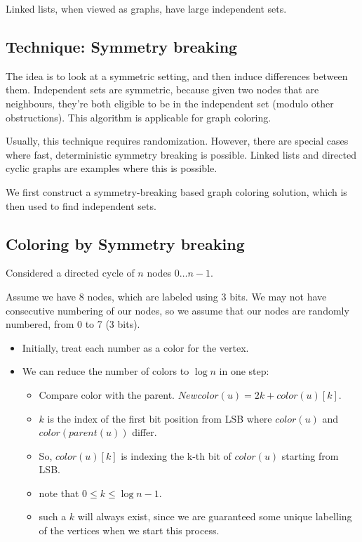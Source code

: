 Linked lists, when viewed as graphs, have large independent sets.

\subsection{Technique: Symmetry breaking}
The idea is to look at a symmetric setting, and then induce differences
between them. Independent sets are symmetric, because given two nodes
that are neighbours, they're both eligible to be in the independent set 
(modulo other obstructions). This algorithm is applicable for graph coloring.

Usually, this technique requires randomization. However, there are special
cases where fast, deterministic symmetry breaking is possible. Linked lists
and directed cyclic graphs are examples where this is possible.

We first construct a symmetry-breaking based graph coloring solution,
which is then used to find independent sets.

\subsection{Coloring by Symmetry breaking}
Considered a directed cycle of $n$ nodes $0 \dots n-1$.

Assume we have 8 nodes, which are labeled using 3 bits. We may not have
consecutive numbering of our nodes, so we assume that our nodes are randomly
numbered, from 0 to 7 (3 bits).


\begin{itemize}
    \item Initially, treat each number as a color for the vertex.
    \item We can reduce the number of colors to $\log n$ in one step:
    \begin{itemize}
    \item Compare color with the parent. $Newcolor(u) = 2 k + color(u)[k]$.
    \item $k$ is the index of the first bit position from LSB where $color(u)$ and $color(parent(u))$ differ.
    \item So, $color(u)[k]$ is indexing the k-th bit of $color(u)$ starting from LSB.
    \item note that $0 \leq k \leq \log n - 1$.
    \item such a $k$ will always exist, since we are guaranteed some unique
    labelling of the vertices when we start this process.
    \end{itemize}
\end{itemize}

